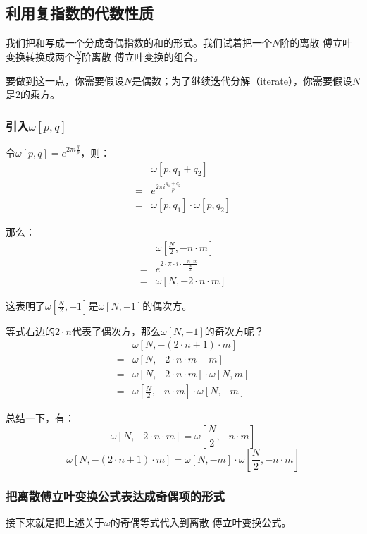 \subsection{利用复指数的代数性质}
我们把和写成一个分成奇偶指数的和的形式。我们试着把一个$N$阶的离散 傅立叶变换转换成两个$\frac{N}{2}$阶离散 傅立叶变换的组合。

要做到这一点，你需要假设$N$是偶数；为了继续迭代分解（iterate），你需要假设$N$是$2$的乘方。
\subsubsection{引入$\omega[p,q]$}
令$\omega[p,q] = e^{2\pi i\frac{q}{p}}$，则：
\begin{align*}
	  & \omega[p,q_1+q_2]                \\
	= & e^{2\pi i\frac{q_1+q_2}{p}}      \\
	= & \omega[p,q_1]\cdot \omega[p,q_2]
\end{align*}

那么：
\begin{align*}
	  & \omega[\frac{N}{2},-n\cdot m]                             \\
	= & e^{2\cdot \pi\cdot  i\cdot \frac{-n\cdot m}{\frac{N}{2}}} \\
	= & \omega[N,-2\cdot n\cdot m]
\end{align*}

这表明了$\omega[\frac{N}{2},-1]$是$\omega[N,-1]$的偶次方。

等式右边的$2\cdot n$代表了偶次方，那么$\omega[N,-1]$的奇次方呢？
\begin{align*}
	  & \omega[N,-(2\cdot n+1)\cdot m]                  \\
	= & \omega[N,-2\cdot n\cdot m-m]                    \\
	= & \omega[N,-2\cdot n\cdot m]\cdot    \omega[N, m] \\
	= & \omega[\frac{N}{2},-n\cdot m]\cdot \omega[N,-m]
\end{align*}

总结一下，有：
\begin{equation}
	\omega[N,-2\cdot n\cdot m]  = \omega[\frac{N}{2},-n\cdot m]
\end{equation}
\begin{equation}
	\omega[N,-(2\cdot n+1)\cdot m]  = \omega[N,-m]\cdot \omega[\frac{N}{2},-n\cdot m]
\end{equation}

\subsubsection{把离散傅立叶变换公式表达成奇偶项的形式}
接下来就是把上述关于$\omega$的奇偶等式代入到离散 傅立叶变换公式。

